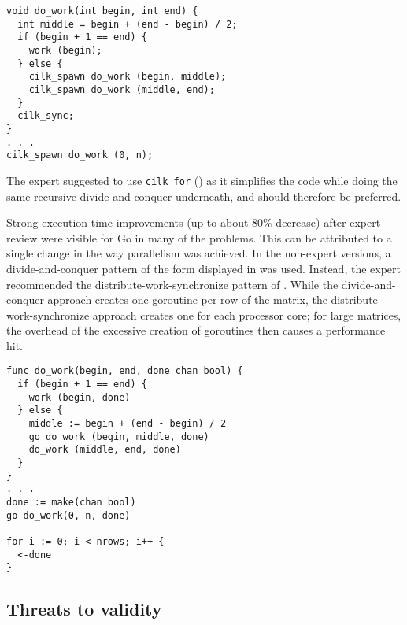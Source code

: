 \begin{lstlisting}
void do_work(int begin, int end) {
  int middle = begin + (end - begin) / 2;
  if (begin + 1 == end) {
    work (begin);
  } else {
    cilk_spawn do_work (begin, middle);
    cilk_spawn do_work (middle, end);
  }
  cilk_sync;
}
. . .
cilk_spawn do_work (0, n);
\end{lstlisting}

The expert suggested to use \mbox{\lstinline[basicstyle=\normalsize]{cilk_for}} () as it simplifies the code while doing the same recursive divide-and-conquer underneath, and should therefore be preferred. 

















Strong execution time improvements (up to about 80\% decrease) after expert review were visible for Go in many of the problems. This can be attributed to a single change in the way parallelism was achieved. In the non-expert versions, a divide-and-conquer pattern of the form displayed in  was used. Instead, the expert recommended the distribute-work-synchronize pattern of . While the divide-and-conquer approach creates one goroutine per row of the matrix, the distribute-work-synchronize approach creates one for each processor core; for large matrices, the overhead of the excessive creation of goroutines then causes a performance hit.




\begin{lstlisting}
func do_work(begin, end, done chan bool) {
  if (begin + 1 == end) {
    work (begin, done)
  } else {
    middle := begin + (end - begin) / 2
    go do_work (begin, middle, done)
    do_work (middle, end, done)
  }
}
. . .
done := make(chan bool)
go do_work(0, n, done)

for i := 0; i < nrows; i++ {
  <-done
}
\end{lstlisting}








\subsection{Threats to validity}
\label{sec:threats-to-validity}



